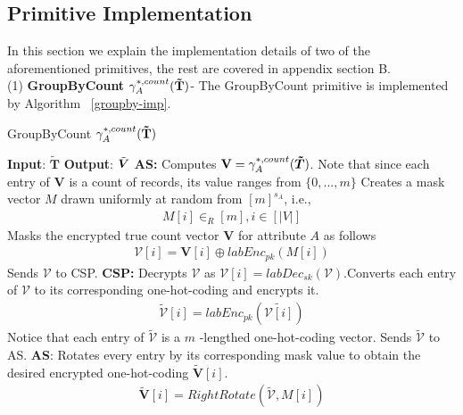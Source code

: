 \subsection{Primitive Implementation}
In this section we explain the implementation details of two of the aforementioned \system primitives, the rest are covered in appendix section B.\\ (1)\textbf{ \textsf{GroupByCount }}$\gamma^{*,count}_A(\mathbf{\tilde{T}})$- The \textsf{GroupByCount} primitive is implemented by Algorithm ~\ref{groupby-imp}. \begin{algorithm}
\small
\caption{\textsf{GroupByCount }$\gamma^{*,count}_A(\mathbf{\tilde{T}})$}
\begin{algorithmic}[1]
\STATEx
\textbf{Input}: $\mathbf{\tilde{T}}$
\STATEx \textbf{Output}: $\tilde{\boldsymbol{V}}$
\STATEx \textbf{\textsf{AS}:} \STATE Computes $\mathbf{V}=\gamma^{*,count}_{A}(\boldsymbol{\tilde{T}})$. Note that since each entry of $\mathbf{V}$ is a count of records, its value ranges from $\{0,...,m\}$ \STATE Creates a mask vector $M$ drawn uniformly at random from $[m]^{s_A}$, i.e.,  \begin{gather*} M[i] \in_R [m], i \in [|V|]\end{gather*} 
\STATE Masks the encrypted true count vector $\mathbf{V}$ for attribute $A$ as follows \begin{gather*}\boldsymbol{\mathcal{V}}[i]= \mathbf{V}[i] \oplus labEnc_{pk}(M[i])\end{gather*}
\STATE Sends $\boldsymbol{\mathcal{V}}$ to \textsf{CSP}.
\STATEx \textbf{\textsf{CSP}:}
\STATE Decrypts  $\boldsymbol{\mathcal{V}}$ as $\mathcal{V}[i]=labDec_{sk}(\boldsymbol{\mathcal{V}})$.\STATE Converts each entry of $\mathcal{V}$ to its corresponding one-hot-coding and encrypts it. \begin{gather*}\boldsymbol{\tilde{\mathcal{V}}}[i]=labEnc_{pk}(\tilde{\mathcal{V}[i]})\end{gather*} Notice that each entry of $\boldsymbol{\tilde{\mathcal{V}}}$ is a $m$ -lengthed one-hot-coding vector.
\STATE Sends $\boldsymbol{\tilde{\mathcal{V}}}$ to \textsf{AS}.
\STATEx \textbf{\textsf{AS}}:
\STATE  Rotates every entry by its corresponding mask value to obtain the desired  encrypted one-hot-coding $\boldsymbol{\tilde{V}}[i]$. \begin{gather*}\boldsymbol{\tilde{V}}[i]=RightRotate(\boldsymbol{\tilde{\mathcal{V}}},M[i])\end{gather*} 
 \end{algorithmic} \label{groupby-imp}
\end{algorithm} 
